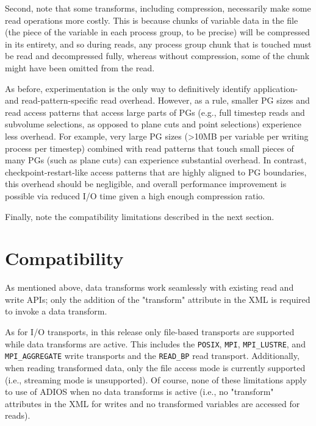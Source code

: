 Second, note that some transforms, including compression, necessarily make some read operations more costly. This is because
chunks of variable data in the file (the piece of the variable in each process group, to be precise) will be compressed
in its entirety, and so during reads, any process group chunk that is touched must be read and decompressed fully, whereas
without compression, some of the chunk might have been omitted from the read.

As before, experimentation is the only way to definitively identify application- and read-pattern-specific read overhead.
However, as a rule, smaller PG sizes and read access
patterns that access large parts of PGs (e.g., full timestep reads and subvolume selections, as opposed to plane cuts and
point selections) experience less overhead. For example, very large PG sizes (>10MB per variable per writing process per timestep)
combined with read patterns that touch small pieces of many PGs (such as plane cuts) can experience substantial overhead.
In contrast, checkpoint-restart-like access patterns that are highly aligned to PG boundaries,
this overhead should be negligible, and overall performance improvement is possible via reduced I/O time given a high enough compression
ratio.

Finally, note the compatibility limitations described in the next section.

\section{Compatibility}
As mentioned above, data transforms work seamlessly with existing read and write APIs; only the addition of the "transform" attribute
in the XML is required to invoke a data transform.

As for I/O transports, in this release only file-based transports are supported while data transforms are active.
This includes the \verb+POSIX+, \verb+MPI+, \verb+MPI_LUSTRE+, and \verb+MPI_AGGREGATE+ write transports and
the \verb+READ_BP+ read transport. Additionally,
when reading transformed data, only the file access mode is currently supported (i.e., streaming mode is unsupported).
Of course, none of these limitations apply to use of ADIOS when no data transforms is active
(i.e., no "transform" attributes in the XML for writes and no transformed variables are accessed for reads).

